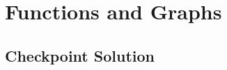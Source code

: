 \documentclass[11pt, letterpaper, oneside]{memoir}
\begin{document}
\chapter{Functions and Graphs}

\section*{Checkpoint Solution}


\end{document}
